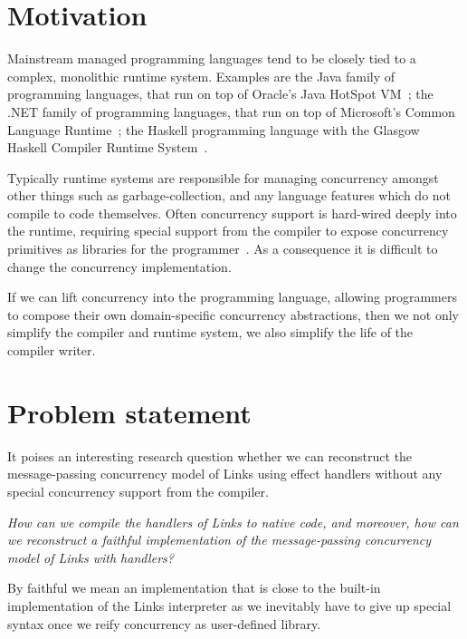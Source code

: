 \documentclass[12pt,mscres,cdtppar,twoside,openright,logo,rightchapter,normalheadings]{infthesis}
\theoremstyle{definition}
\begin{document}
\section{Motivation}
\label{sec:motivation}

Mainstream managed programming languages tend to be closely tied to a
complex, monolithic runtime system. Examples are the Java family of
programming languages, that run on top of Oracle's Java HotSpot
VM~\citep{HotSpot2016}; the .NET family of programming languages, that
run on top of Microsoft's Common Language Runtime~\citep{CLR2016}; the
Haskell programming language with the Glasgow Haskell Compiler Runtime
System~\citep{GHC2014}.

Typically runtime systems are responsible for managing concurrency
amongst other things such as garbage-collection, and any language
features which do not compile to code themselves. Often concurrency
support is hard-wired deeply into the runtime, requiring special
support from the compiler to expose concurrency primitives as
libraries for the programmer~\citep{KC2016}. As a consequence it is
difficult to change the concurrency implementation.

If we can lift concurrency into the programming language, allowing
programmers to compose their own domain-specific concurrency
abstractions, then we not only simplify the compiler and runtime
system, we also simplify the life of the compiler writer.
%

\section{Problem statement}
\label{sec:problem-statement}

It poises an interesting research question whether we can reconstruct
the message-passing concurrency model of Links using effect handlers
without any special concurrency support from the compiler.

\begin{center}
  \emph{How can we compile the handlers of Links to native code, and
    moreover, how can we reconstruct a faithful implementation of the
    message-passing concurrency model of Links with handlers?}
\end{center}

By faithful we mean an implementation that is close to the built-in
implementation of the Links interpreter as we inevitably have to give
up special syntax once we reify concurrency as user-defined library.
\end{document}
